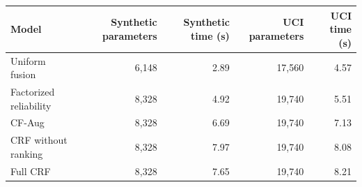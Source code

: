 \begin{tabular}{lrrrr}
\toprule
Model & Synthetic parameters & Synthetic time (s) & UCI parameters & UCI time (s) \\
\midrule
Uniform fusion & 6,148 & 2.89 & 17,560 & 4.57 \\
Factorized reliability & 8,328 & 4.92 & 19,740 & 5.51 \\
CF-Aug & 8,328 & 6.69 & 19,740 & 7.13 \\
CRF without ranking & 8,328 & 7.97 & 19,740 & 8.08 \\
Full CRF & 8,328 & 7.65 & 19,740 & 8.21 \\
\bottomrule
\end{tabular}